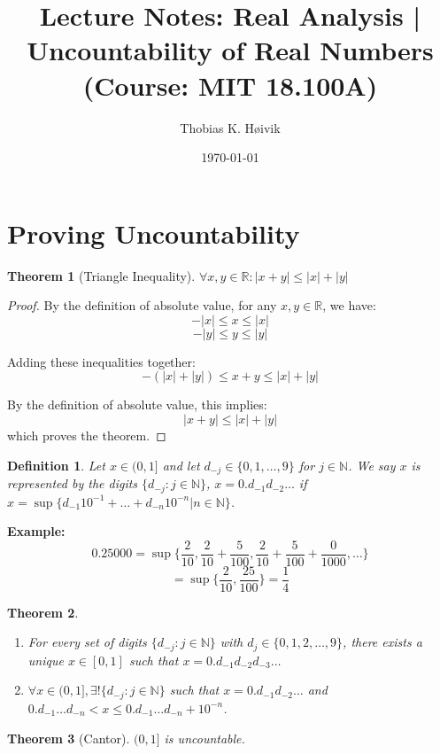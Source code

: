 \documentclass[12pt]{article}
\title{Lecture Notes: Real Analysis | Uncountability of Real Numbers (Course: MIT 18.100A)}
\author{Thobias K. Høivik}
\date{\today}
\newtheorem{theorem}{Theorem}
\newtheorem{definition}{Definition}
\begin{document}
\maketitle
\section*{Proving Uncountability}
\begin{theorem}[Triangle Inequality]
    \(\forall x,y \in \mathbb R : |x+y| \leq |x| + |y|\) 
\end{theorem}
\begin{proof}
    By the definition of absolute value, for any \( x, y \in \mathbb{R} \), we have:
    \[
        -|x| \leq x \leq |x|
    \]
    \[
        -|y| \leq y \leq |y|
    \]
    
    Adding these inequalities together:
    \[
        -(|x| + |y|) \leq x + y \leq |x| + |y|
    \]
    
    By the definition of absolute value, this implies:
    \[
        |x+y| \leq |x| + |y|
    \]
    which proves the theorem.
\end{proof}
\begin{definition}
    Let \(x \in (0,1]\) and let \(d_{-j}\in \{0,1,\dots,9\}\) for \(j \in \mathbb N\).
    We say \(x\) is represented by the digits \(\{d_{-j} : j \in \mathbb N\}\), 
    \(x = 0.d_{-1}d_{-2}\dots\) if \(x = \sup\{d_{-1}10^{-1}+\dots 
    + d_{-n}10^{-n} | n \in \mathbb N\}\).
\end{definition}
\noindent
\textbf{Example:}
\[0.25000 = \sup\{\frac{2}{10},\frac{2}{10}+\frac{5}{100},
\frac{2}{10}+\frac{5}{100}+\frac{0}{1000},\dots\}\]
\[= \sup\{\frac{2}{10},\frac{25}{100}\} = \frac{1}{4}\]
\begin{theorem}
    \noindent
    \begin{enumerate}
        \item For every set of digits \(\{d_{-j} : j\in\mathbb N\}\) 
            with \(d_j \in \{0,1,2,\dots,9\}\), there exists a unique 
            \(x \in [0,1]\) such that \(x = 0.d_{-1}d_{-2}d_{-3}\dots\)

        \item \(\forall x \in (0,1], \exists! \{d_{-j} : j\in\mathbb N\} \)  
            such that \(x = 0.d_{-1}d_{-2}\dots\) and 
            \(0.d_{-1}\dots d_{-n} < x \leq 0.d_{-1}\dots d_{-n} + 10^{-n}\).
    \end{enumerate}
\end{theorem}
\begin{theorem}[Cantor]
    \((0,1]\) is uncountable. 
\end{theorem}
\end{document}
